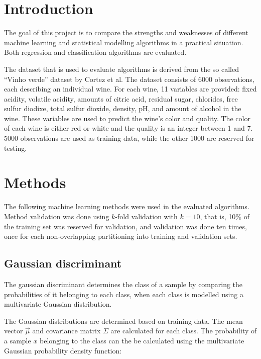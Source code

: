 \documentclass[twoside]{article}
\renewcommand{\v}[1]{\vec{#1}}
\begin{document}
\begin{multicols}{2} %

\section{Introduction}

The goal of this project is to compare the strengths and weaknesses of different machine learning
and statistical modelling algorithms in a practical situation. Both regression and classification
algorithms are evaluated.

The dataset that is used to evaluate algorithms is derived from the so called ``Vinho verde'' dataset by Cortez et al\cite{CorCer09}.
The dataset consists of 6000 observations, each describing an individual wine. For each wine, 11 variables are provided:
fixed acidity, volatile acidity, amounts of citric acid, residual sugar, chlorides, free sulfur diodixe, total sulfur dioxide,
density, pH, and amount of alcohol in the wine. These variables are used to predict the wine's color and quality.
The color of each wine is either red or white and the quality is an integer between 1 and 7. 5000 observations are used as
training data, while the other 1000 are reserved for testing.


\section{Methods}

The following machine learning methods were used in the evaluated algorithms.
Method validation was done using $k$-fold validation with $k = 10$,
that is, 10\% of the training set was reserved for validation, and validation
was done ten times, once for each non-overlapping partitioning into training and validation sets.

\subsection{Gaussian discriminant}

The gaussian discriminant determines the class of a sample by
comparing the probabilities of it belonging to each class, when each
class is modelled using a multivariate Gaussian distribution.

The Gaussian distributions are determined based on training data.
The mean vector $\v{\mu}$ and covariance matrix $\Sigma$ are calculated for each class.
The probability of a sample $x$ belonging to the class can the be calculated
using the multivariate Gaussian probability density function:


\end{multicols}
\end{document}
